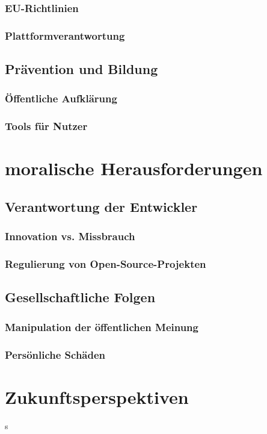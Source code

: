 \documentclass[a4paper,12pt]{article}
\begin{document}
\subsubsection{EU-Richtlinien}
\subsubsection{Plattformverantwortung}
\subsection{Prävention und Bildung}
\subsubsection{Öffentliche Aufklärung}
\subsubsection{Tools für Nutzer}
\newpage

\section{moralische Herausforderungen}
\subsection{Verantwortung der Entwickler}
\subsubsection{Innovation vs. Missbrauch}
\subsubsection{Regulierung von Open-Source-Projekten}
\subsection{Gesellschaftliche Folgen}
\subsubsection{Manipulation der öffentlichen Meinung}
\subsubsection{Persönliche Schäden}
\newpage

\section{Zukunftsperspektiven}s
\end{document}
